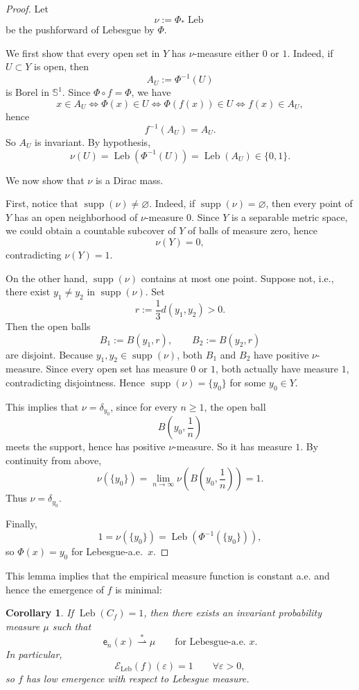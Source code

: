 \documentclass[12pt,a4paper,twoside]{article}
\theoremstyle{plain}
\newtheorem{corollary}[theorem]{Corollary}
\theoremstyle{definition}
\newcommand{\supp}{\operatorname{supp}}
\newcommand{\eps}{\varepsilon}
\newcommand{\Leb}{\operatorname{Leb}}
\newcommand{\emp}{\mathsf e}
\newcommand{\Sone}{\mathbb{S}^1}
\newcommand{\wto}{\overset{*}{\rightharpoonup}}
\begin{document}
	\begin{proof}
		Let
		\[
		\nu:=\Phi_*\Leb
		\]
		be the pushforward of Lebesgue by $\Phi$.
		
		We first show that every open set in $Y$ has $\nu$-measure either $0$ or $1$.
		Indeed, if $U\subset Y$ is open, then
		\[
		A_U:=\Phi^{-1}(U)
		\]
		is Borel in $\Sone$.
		Since $\Phi\circ f=\Phi$, we have
		\[
		x\in A_U
		\iff \Phi(x)\in U
		\iff \Phi(f(x))\in U
		\iff f(x)\in A_U,
		\]
		hence
		\[
		f^{-1}(A_U)=A_U.
		\]
		So $A_U$ is invariant.
		By hypothesis,
		\[
		\nu(U)=\Leb(\Phi^{-1}(U))=\Leb(A_U)\in\{0,1\}.
		\]
		
		We now show that $\nu$ is a Dirac mass.
		
	First, notice that $\supp(\nu)\neq\varnothing$. Indeed, if $\supp(\nu)=\varnothing$, then every point of $Y$ has an open neighborhood of $\nu$-measure $0$.
		Since $Y$ is a separable metric space, we could obtain a countable subcover of $Y$ of balls of measure zero, hence
		\[
		\nu(Y)=0,
		\]
		contradicting $\nu(Y)=1$.
		
	On the other hand, $\supp(\nu)$ contains at most one point. Suppose not, i.e., there exist $y_1\neq y_2$ in $\supp(\nu)$.
		Set
		\[
		r:=\frac13 d(y_1,y_2)>0.
		\]
		Then the open balls
		\[
		B_1:=B(y_1,r),\qquad B_2:=B(y_2,r)
		\]
		are disjoint.
		Because $y_1,y_2\in \supp(\nu)$, both $B_1$ and $B_2$ have positive $\nu$-measure.
		Since every open set has measure $0$ or $1$, both actually have measure $1$,
		contradicting disjointness.
		Hence $\supp(\nu)=\{y_0\}$ for some $y_0\in Y$.
		
	This implies that $\nu=\delta_{y_0}$, since for every $n\ge1$, the open ball
		\[
		B\!\left(y_0,\frac1n\right)
		\]
		meets the support, hence has positive $\nu$-measure.
		So it has measure $1$.
		By continuity from above,
		\[
		\nu(\{y_0\})
		=
		\lim_{n\to\infty}\nu\!\left(B\!\left(y_0,\frac1n\right)\right)
		=
		1.
		\]
		Thus $\nu=\delta_{y_0}$.
		
		Finally,
		\[
		1=\nu(\{y_0\})=\Leb(\Phi^{-1}(\{y_0\})),
		\]
		so $\Phi(x)=y_0$ for Lebesgue-a.e.\ $x$.
	\end{proof}
	
	This lemma implies that the empirical measure function is constant a.e. and hence the emergence of $f$ is minimal:
	
	\begin{corollary}\label{cor:C-full-unique}
		If $\Leb(C_{f})=1$, then there exists an invariant probability measure $\mu$ such that
		\[
		\emp_n(x)\wto \mu
		\qquad\text{for Lebesgue-a.e. }x.
		\]
		In particular,
		\[
		\mathcal{E}_{\Leb}(f)(\eps)=1
		\qquad\forall \eps>0,
		\]
		so $f$ has low emergence with respect to Lebesgue measure.
	\end{corollary}
	
\end{document}
